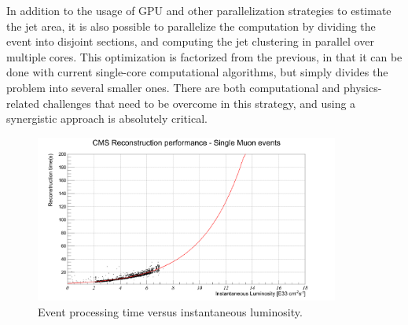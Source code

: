 \documentclass[12pt]{article}
\begin{document}
In addition to the usage of GPU and other parallelization strategies
to estimate the jet area, it is also possible to parallelize the
computation by dividing the event into disjoint sections, and
computing the jet clustering in parallel over multiple cores. This
optimization is factorized from the previous, in that it can be done
with current single-core computational algorithms, but simply divides
the problem into several smaller ones. There are both computational
and physics-related challenges that need to be overcome in this
strategy, and using a synergistic approach is absolutely critical. 



\begin{figure}[h!]
    \centering
    \includegraphics[width=100mm]{lumitpeSingleMu-fitted2.png}
    \caption{\label{lumitpeSingleMu} Event processing time versus
      instantaneous luminosity.}
\end{figure}


{}
%
\end{document}
